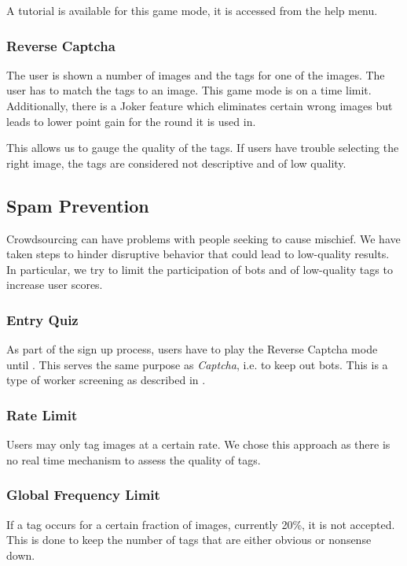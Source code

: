 A tutorial is available for this game mode, it is accessed from the help menu.

\subsubsection{Reverse Captcha}
\label{g14:sec:concepts:Gamemodes:reversecaptca}
The user is shown a number of images and the tags for one of the images. The user has to match the tags to an image.
This game mode is on a time limit. Additionally, there is a Joker feature which eliminates certain wrong images but leads to lower point gain for the round it is used in.

This allows us to gauge the quality of the tags. If users have trouble selecting the right image, the tags are considered not descriptive and of low quality.


\subsection{Spam Prevention}
\label{g14:sec:concepts:spamprevention}
Crowdsourcing can have problems with people seeking to cause mischief. We have taken steps to hinder disruptive behavior that could lead to low-quality results. In particular, we try to limit the participation of bots and  of low-quality tags to increase user scores.


\subsubsection{Entry Quiz}
\label{g14:sec:concepts:spamprevention:entryquiz}
As part of the sign up process, users have to play the Reverse Captcha mode until . This serves the same purpose as \textit{Captcha}, i.e. to keep out bots. This is a type of worker screening as described in \cite{oleson2011programmatic}.


\subsubsection{Rate Limit}
\label{g14:sec:concepts:spamprevention:ratelimit}
Users may only tag images at a certain rate. We chose this approach as there is no real time mechanism to assess the quality of tags.


\subsubsection{Global Frequency Limit}
\label{g14:sec:concepts:spamprevention:frequencylimit}
If a tag occurs for a certain fraction of images, currently 20\%, it is not accepted. This is done to keep the number of tags that are either obvious or nonsense down.

